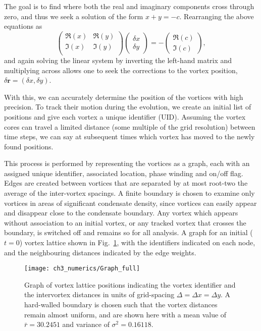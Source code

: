 The goal is to find where both the real and imaginary components cross through zero, and thus we seek a solution of the form $x + y = -c$. Rearranging the above equations as
\begin{equation}\left(
    \begin{array}{cc}
        \Re(x) & \Re(y) \\
        \Im(x) & \Im(y) \\
    \end{array}\right)
    \left(
    \begin{array}{c}
        \delta x \\
        \delta y
    \end{array}\right)
    = -
    \left(
    \begin{array}{c}
        \Re(c) \\
        \Im(c)
    \end{array}\right),
\end{equation}
and again solving the linear system by inverting the left-hand matrix and multiplying across allows one to seek the corrections to the vortex position, $\delta \mathbf{r} = (\delta x, \delta y )$.

 With this, we can accurately determine the position of the vortices with high precision. To track their motion during the evolution, we create an initial list of positions and give each vortex a unique identifier (UID). Assuming the vortex cores can travel a limited distance (some multiple of the grid resolution) between time steps, we can say at subsequent times which vortex has moved to the newly found positions.

 This process is performed by representing the vortices as a graph, each with an assigned unique identifier, associated location, phase winding and on/off flag. Edges are created between vortices that are separated by at most root-two the average of the inter-vortex spacings. A finite boundary is chosen to examine only vortices in areas of significant condensate density, since vortices can easily appear and disappear close to the condensate boundary. Any vortex which appears without association to an initial vortex, or any tracked vortex that crosses the boundary, is switched off and remains so for all analysis. A graph for an initial ($t=0$) vortex lattice shown in Fig.~\ref{fig:graphit}, with the identifiers indicated on each node, and the neighbouring distances indicated by the edge weights. %

 \begin{figure}
     \centering
     \texttt{[image: ch3\_numerics/Graph\_full]}
     \caption{Graph of vortex lattice positions indicating the vortex identifier and the intervortex distances in units of grid-spacing $\Delta= \Delta x = \Delta y$. A hard-walled boundary is chosen such that the vortex distances remain almost uniform, and are shown here with a mean value of $\bar{r} = 30.2451$ and variance of $\sigma^2 = 0.16118$.}
     \label{fig:graphit}
 \end{figure}
